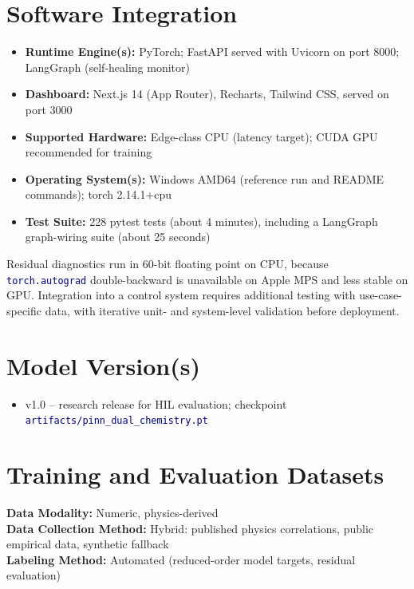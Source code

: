 \documentclass[10.5pt,a4paper]{article}
\newcommand{\code}[1]{\texttt{\textcolor{navy}{#1}}}
\begin{document}
\section*{Software Integration}
\begin{itemize}
  \item \textbf{Runtime Engine(s):} PyTorch; FastAPI served with Uvicorn on port 8000; LangGraph (self-healing monitor)
  \item \textbf{Dashboard:} Next.js 14 (App Router), Recharts, Tailwind CSS, served on port 3000
  \item \textbf{Supported Hardware:} Edge-class CPU (latency target); CUDA GPU recommended for training
  \item \textbf{Operating System(s):} Windows AMD64 (reference run and README commands); torch 2.14.1+cpu
  \item \textbf{Test Suite:} 228 pytest tests (about 4 minutes), including a LangGraph graph-wiring suite (about 25 seconds)
\end{itemize}
Residual diagnostics run in 60-bit floating point on CPU, because \code{torch.autograd} double-backward is unavailable on Apple MPS and less stable on GPU. Integration into a control system requires additional testing with use-case-specific data, with iterative unit- and system-level validation before deployment.

\section*{Model Version(s)}
\begin{itemize}
  \item v1.0 -- research release for HIL evaluation; checkpoint \code{artifacts/pinn\_dual\_chemistry.pt}
\end{itemize}

\section*{Training and Evaluation Datasets}
\textbf{Data Modality:} Numeric, physics-derived \\
\textbf{Data Collection Method:} Hybrid: published physics correlations, public empirical data, synthetic fallback \\
\textbf{Labeling Method:} Automated (reduced-order model targets, residual evaluation)
\end{document}
